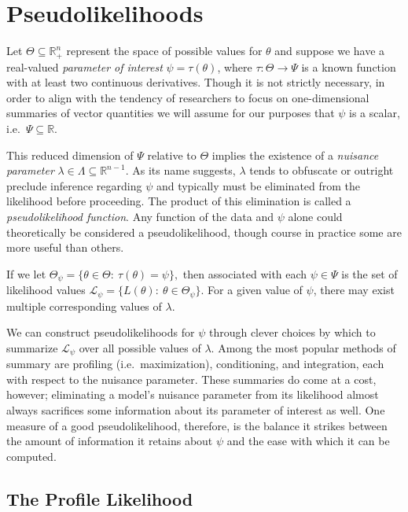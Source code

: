 \documentclass[
  12pt]{article}
\begin{document}
\section{Pseudolikelihoods}\label{pseudolikelihoods}

Let \(\Theta \subseteq \mathbb{R}^n_+\) represent the space of possible
values for \(\theta\) and suppose we have a real-valued \emph{parameter
of interest} \(\psi = \tau(\theta)\), where \(\tau: \Theta \to \Psi\) is
a known function with at least two continuous derivatives. Though it is
not strictly necessary, in order to align with the tendency of
researchers to focus on one-dimensional summaries of vector quantities
we will assume for our purposes that \(\psi\) is a scalar,
i.e.~\(\Psi \subseteq \mathbb{R}\).

This reduced dimension of \(\Psi\) relative to \(\Theta\) implies the
existence of a \emph{nuisance parameter}
\(\lambda \in \Lambda \subseteq \mathbb{R}^{n-1}\). As its name
suggests, \(\lambda\) tends to obfuscate or outright preclude inference
regarding \(\psi\) and typically must be eliminated from the likelihood
before proceeding. The product of this elimination is called a
\emph{pseudolikelihood function}. Any function of the data and \(\psi\)
alone could theoretically be considered a pseudolikelihood, though
course in practice some are more useful than others.

If we let
\(\Theta_{\psi} = \{\theta \in \Theta: \> \tau(\theta) = \psi \},\) then
associated with each \(\psi \in \Psi\) is the set of likelihood values
\(\mathcal{L}_{\psi} = \{L(\theta): \> \theta \in \Theta_{\psi}\}.\) For
a given value of \(\psi\), there may exist multiple corresponding values
of \(\lambda\).

We can construct pseudolikelihoods for \(\psi\) through clever choices
by which to summarize \(\mathcal{L}_{\psi}\) over all possible values of
\(\lambda\). Among the most popular methods of summary are profiling
(i.e.~maximization), conditioning, and integration, each with respect to
the nuisance parameter. These summaries do come at a cost, however;
eliminating a model's nuisance parameter from its likelihood almost
always sacrifices some information about its parameter of interest as
well. One measure of a good pseudolikelihood, therefore, is the balance
it strikes between the amount of information it retains about \(\psi\)
and the ease with which it can be computed.

\subsection{The Profile Likelihood}\label{the-profile-likelihood}
\end{document}
